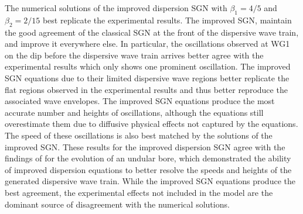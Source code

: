 \documentclass[10pt]{elsarticle}
\begin{document}
{The numerical solutions of the improved dispersion SGN with $\beta_1 = 4/5$ and $\beta_2 = 2/15$ best replicate the experimental results. The improved SGN, maintain the good agreement of the classical SGN at the front of the dispersive wave train, and improve it everywhere else. In particular, the oscillations observed at WG1 on the dip before the dispersive wave train arrives better agree with the experimental results which only shows one prominent oscillation. The improved SGN equations due to their limited dispersive wave regions better replicate the flat regions observed in the experimental results and thus better reproduce the associated wave envelopes. The improved SGN equations produce the most accurate number and heights of oscillations, although the equations still overestimate them due to diffusive physical effects not captured by the equations. The speed of these oscillations is also best matched by the solutions of the improved SGN. These results for the improved dispersion SGN agree with the findings of \citet{DoCarmo-2018} for the evolution of an undular bore, which demonstrated the ability of improved dispersion equations to better resolve the speeds and heights of the generated dispersive wave train. While the improved SGN equations produce the best agreement, the experimental effects not included in the model are the dominant source of disagreement with the numerical solutions. 

%

}
\end{document}
